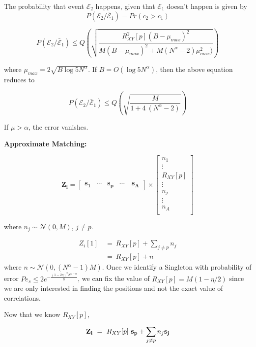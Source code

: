 The probability that event $\mathcal{E}_2$ happens, given that $\mathcal{E}_1$ doesn't happen is given by
\[ P(\mathcal{E}_2 / \bar{\mathcal{E}}_1 ) = Pr(c_2 > c_1) \]



\[ P(\mathcal{E}_2 / \bar{\mathcal{E}}_1 ) \leq Q \left( \sqrt{\frac{R_{XY}^{2}[p](B-\mu_{max})^2}{M(B-\mu_{max})^2 + M(N^{\alpha}-2)\mu_{max}^2)}} \right) \]
	
	where $\mu_{max} = 2\sqrt{B \log 5 N^{\alpha}} $. If $B = O(\log 5 N^{\alpha})$, then the above equation reduces to

\[ P(\mathcal{E}_2 / \bar{\mathcal{E}}_1 ) \leq Q \left( \sqrt{\frac{M}{1 + 4 ~ (N^{\alpha}-2)}} \right) \]

If $\mu > \alpha$, the error vanishes.


{\bf Approximate Matching:}


\[
\mathbf{Z_i} = \begin{bmatrix}
\mathbf{s_1}       & \cdots   & \mathbf{s_p} &\cdots \ &\mathbf{s_A}
\end{bmatrix} \times
\begin{bmatrix}
n_1 \\
\vdots \\
R_{XY}[p]\\
\vdots\\
n_j \\
\vdots\\
n_{A}\\
\end{bmatrix}
\]


where $n_j \sim \mathcal{N}(0,M)$, $j \neq p$.

\[\begin{array}{ll}
Z_i[1] \ &= \ R_{XY}[p] + \sum_{j \neq p}n_j \\
&= \ R_{XY}[p] + n 
\end{array}
\]
where $n \sim \mathcal{N}(0,(N^\alpha-1)M)$. Once we identify a Singleton with probability of error $Pe_s \leq 2 e^{- \frac{(1-2\eta)^2N^{\mu-\alpha}}{8}}$, we can fix the value of $R_{XY}[p] = M(1-\eta/2)$ since we are only interested in finding the positions and not the exact value of correlations. 

Now that we know $R_{XY}[p]$, 

\[ \mathbf{Z_i} \ = \ R_{XY}[p] ~ \mathbf{s_p}+ \sum_{j \neq p}n_j \mathbf{s_j} \\
\]

